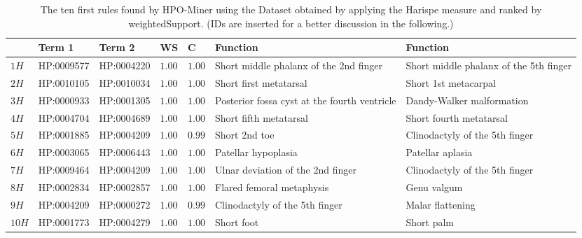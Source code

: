 \documentclass{article}
\theoremstyle{definition}
\begin{document}
\begin{table}[ht]

\caption{The ten first rules found by HPO-Miner using the Dataset obtained by applying the Harispe measure and ranked by weightedSupport. (IDs are inserted for a better discussion in the following.) }
\label{tab:Harispe}
\begin{tabular}{|p{0.5cm}|l|l|p{0.5cm}|p{0.5cm}|p{2.0cm}|p{2.0cm}|}
\hline 
\textbf{}&\textbf{Term 1}& \textbf{Term 2} & \textbf{WS} & \textbf{C} &\textbf{Function} & \textbf{Function }\\ 
\hline
$	1H	$&	HP:0009577	&	HP:0004220	&$	1.00	$&$	1.00$&	Short middle phalanx of the 2nd finger   &      Short middle phalanx of the 5th finger \\ 
\hline 
$	2H	$&	HP:0010105	&	HP:0010034	&$	1.00	$&$	1.00	$&	Short first metatarsal      &     Short 1st metacarpal\\ 
\hline
$	3H	$&	HP:0000933	&	HP:0001305	&$	1.00	$&$	1.00	$&	Posterior fossa cyst at the fourth ventricle	 &   Dandy-Walker malformation\\ 
\hline
$	4H	$&	HP:0004704	&	HP:0004689	&$	1.00	$&$	1.00	$&	Short fifth metatarsal	&      Short fourth metatarsal\\ 
\hline
$	5H	$&	HP:0001885	&	HP:0004209	&$	1.00	$&$	0.99	$&	Short 2nd toe   &   Clinodactyly of the 5th finger\\ 
\hline
$	6H	$&	HP:0003065	&	HP:0006443	&$	1.00	$&$	1.00	$&	Patellar hypoplasia  &     Patellar aplasia\\ 
\hline
$	7H	$&	HP:0009464	&	HP:0004209	&$	1.00	$&$	1.00	$&	 Ulnar deviation of the 2nd finger   &    Clinodactyly of the 5th finger\\ 
\hline
$	8H	$&	HP:0002834	&	HP:0002857	&$	1.00	$&$	1.00	$&	Flared femoral metaphysis     &    Genu valgum\\ 
\hline
$	9H	$&	HP:0004209	&	HP:0000272	&$	1.00	$&$	0.99	$&	Clinodactyly of the 5th finger &    Malar flattening\\ 
\hline
$	10H	$&	HP:0001773	&	HP:0004279	&$	1.00	$&$	1.00	$&	  Short foot   &  Short palm\\ 
\hline
\end{tabular}
\end{table}
\end{document}
